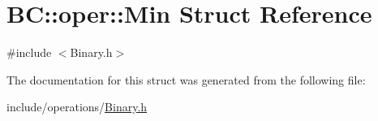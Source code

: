 \hypertarget{structBC_1_1oper_1_1Min}{}\section{BC\+:\+:oper\+:\+:Min Struct Reference}
\label{structBC_1_1oper_1_1Min}


{\ttfamily \#include $<$Binary.\+h$>$}



The documentation for this struct was generated from the following file\+:\begin{DoxyCompactItemize}
\item 
include/operations/\hyperlink{Binary_8h}{Binary.\+h}\end{DoxyCompactItemize}
